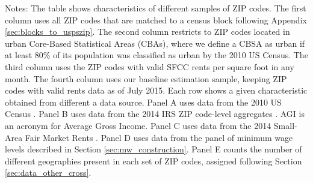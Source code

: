 \begin{landscape}
\begin{table}[hbt!]
    \begin{minipage}{.95\linewidth} \footnotesize
        \vspace{2mm}
        Notes: The table shows characteristics of different samples of ZIP codes.
        The first column uses all ZIP codes that are matched to a census block
        following Appendix \ref{sec:blocks_to_uspszip}.
        The second column restricts to ZIP codes located in urban Core-Based
        Statistical Areas (CBAs), where we define a CBSA as urban if at least
        80\% of its population was classified as urban by the 2010 US Census.
        The third column uses the ZIP codes with valid SFCC rents per square 
        foot in any month.
        The fourth column uses our baseline estimation sample, keeping ZIP codes
        with valid rents data as of July 2015.
        Each row shows a given characteristic obtained from different a data 
        source.
        Panel A uses data from the 2010 US Census \parencite{CensusDecennial}.
        Panel B uses data from the 2014 IRS ZIP code-level aggregates
        \parencite{IRS}. AGI is an acronym for Average Gross Income.
        Panel C uses data from the 2014 Small-Area Fair Market 
        Rents \parencite[SAFMR;][]{hudSAFMR}.
        Panel D uses data from the panel of minimum wage levels 
        described in Section \ref{sec:mw_construction}.
        Panel E counts the number of different geographies present in each set
        of ZIP codes, assigned following Section \ref{sec:data_other_cross}.
    \end{minipage}
\end{table}
\end{landscape}
